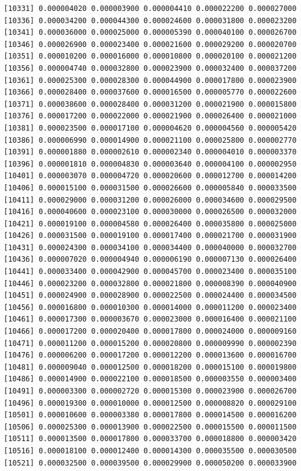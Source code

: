 \documentclass[]{article}
\begin{document}
\begin{verbatim}
[10331] 0.000004020 0.000003900 0.000004410 0.000022200 0.000027000
[10336] 0.000034200 0.000044300 0.000024600 0.000031800 0.000023200
[10341] 0.000036000 0.000025000 0.000005390 0.000040100 0.000026700
[10346] 0.000026900 0.000023400 0.000021600 0.000029200 0.000020700
[10351] 0.000010200 0.000016000 0.000010800 0.000020100 0.000021200
[10356] 0.000004740 0.000032800 0.000023900 0.000032400 0.000037200
[10361] 0.000025300 0.000028300 0.000044900 0.000017800 0.000023900
[10366] 0.000028400 0.000037600 0.000016500 0.000005770 0.000022600
[10371] 0.000038600 0.000028400 0.000031200 0.000021900 0.000015800
[10376] 0.000017200 0.000022000 0.000021900 0.000026400 0.000021000
[10381] 0.000023500 0.000017100 0.000004620 0.000004560 0.000005420
[10386] 0.000006990 0.000014900 0.000021100 0.000025800 0.000002770
[10391] 0.000001880 0.000002610 0.000002340 0.000004010 0.000003370
[10396] 0.000001810 0.000004830 0.000003640 0.000004100 0.000002950
[10401] 0.000003070 0.000004720 0.000020600 0.000012700 0.000014200
[10406] 0.000015100 0.000031500 0.000026600 0.000005840 0.000033500
[10411] 0.000029000 0.000031200 0.000026000 0.000034600 0.000029500
[10416] 0.000040600 0.000023100 0.000030000 0.000026500 0.000032000
[10421] 0.000019100 0.000004580 0.000026400 0.000035800 0.000025000
[10426] 0.000031500 0.000019100 0.000017400 0.000021700 0.000031900
[10431] 0.000024300 0.000034100 0.000034400 0.000040000 0.000032700
[10436] 0.000007020 0.000004940 0.000006190 0.000007130 0.000026400
[10441] 0.000033400 0.000042900 0.000045700 0.000023400 0.000035100
[10446] 0.000023200 0.000032800 0.000021800 0.000008390 0.000040900
[10451] 0.000024900 0.000028900 0.000022500 0.000024400 0.000034500
[10456] 0.000016800 0.000010300 0.000014000 0.000011200 0.000023400
[10461] 0.000017300 0.000003670 0.000023000 0.000016400 0.000021100
[10466] 0.000017200 0.000020400 0.000017800 0.000024000 0.000009160
[10471] 0.000011200 0.000015200 0.000020800 0.000009990 0.000002390
[10476] 0.000006200 0.000017200 0.000012200 0.000013600 0.000016700
[10481] 0.000009040 0.000012500 0.000018200 0.000015100 0.000019800
[10486] 0.000014900 0.000022100 0.000018500 0.000003550 0.000003400
[10491] 0.000003300 0.000002720 0.000015300 0.000023900 0.000026700
[10496] 0.000019300 0.000010000 0.000012500 0.000008820 0.000029100
[10501] 0.000010600 0.000003380 0.000017800 0.000014500 0.000016200
[10506] 0.000025300 0.000013900 0.000022500 0.000015500 0.000011500
[10511] 0.000013500 0.000017800 0.000033700 0.000018800 0.000003420
[10516] 0.000018100 0.000012400 0.000014300 0.000035500 0.000030500
[10521] 0.000032500 0.000039500 0.000029900 0.000050200 0.000033900

\end{verbatim}
\end{document}
